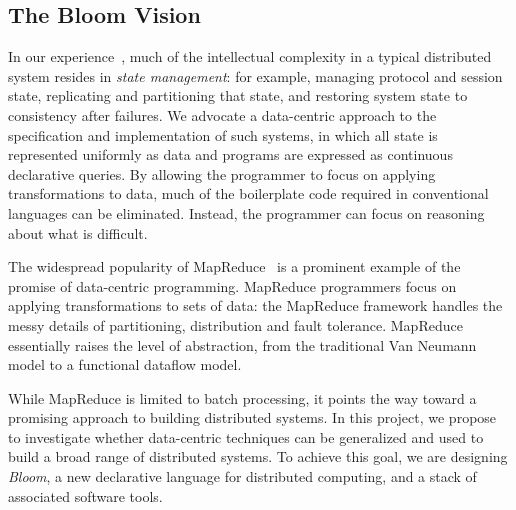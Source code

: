 \subsection{The Bloom Vision}
In our experience~\cite{boom-eurosys, netdb}, much of the intellectual
complexity in a typical distributed system resides in \emph{state
  management}: for example, managing protocol and session state, replicating and
  partitioning that state, and restoring system state to consistency after
  failures. 
We advocate a data-centric approach to the specification and implementation 
of such systems, in which all state is represented uniformly as data and programs
are expressed as continuous declarative queries.
By allowing the programmer to focus on applying transformations to
data, much of the boilerplate code required in conventional languages can be
eliminated. Instead, the programmer can focus on reasoning about what is
difficult.

The widespread popularity of MapReduce~\cite{mapreduce-osdi} is a prominent
example of the promise of data-centric programming. MapReduce programmers focus
on applying transformations to sets of data: the MapReduce framework handles the
messy details of partitioning, distribution and fault tolerance. MapReduce
essentially raises the level of abstraction, from the traditional Van Neumann
model to a functional dataflow model.

While MapReduce is limited to batch processing, it points the way toward a
promising approach to building distributed systems. In this project, we propose
to investigate whether data-centric techniques can be generalized and used to
build a broad range of distributed systems. To achieve this goal, we are
designing \emph{Bloom}, a new declarative language for distributed computing,
and a stack of associated software tools.
